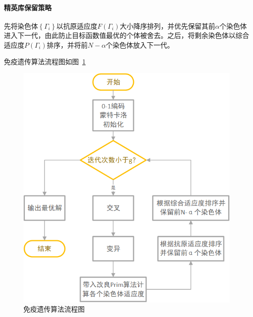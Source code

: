 \documentclass{whutmod}
\begin{document}
  	\paragraph{精英库保留策略}
  	先将染色体$\left \{ \Gamma_i \right \}$以抗原适应度$F(\Gamma_i)$大小降序排列，并优先保留其前$\alpha$个染色体进入下一代，由此防止目标函数值最优的个体被舍去。之后，将剩余染色体以综合适应度$P(\Gamma_i)$排序，并将前$N-\alpha$个染色体放入下一代。
	  
	  免疫遗传算法流程图如图~\ref{bgrs}~
	  \begin{figure}[H]
		\centering
	
		 
		 \includegraphics[width=\textwidth]{figures/a31.png}
		 \caption{	免疫遗传算法流程图}\label{bgrs}
	 \end{figure}
\end{document}
